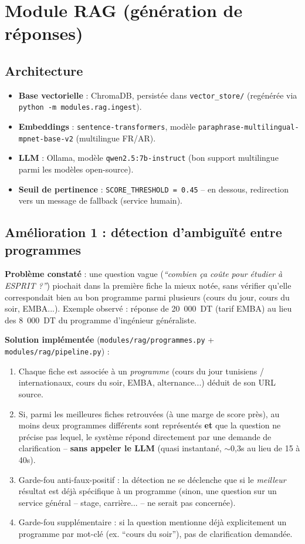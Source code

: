 \documentclass[11pt,a4paper]{report}
\begin{document}
\chapter{Module RAG (génération de réponses)}
\label{chap:rag}

\section{Architecture}
\begin{itemize}
    \item \textbf{Base vectorielle} : ChromaDB, persistée dans \texttt{vector\_store/}
    (regénérée via \texttt{python -m modules.rag.ingest}).
    \item \textbf{Embeddings} : \texttt{sentence-transformers}, modèle
    \texttt{paraphrase-multilingual-mpnet-base-v2} (multilingue FR/AR).
    \item \textbf{LLM} : Ollama, modèle \texttt{qwen2.5:7b-instruct} (bon support
    multilingue parmi les modèles open-source).
    \item \textbf{Seuil de pertinence} : \texttt{SCORE\_THRESHOLD = 0.45} -- en dessous,
    redirection vers un message de fallback (service humain).
\end{itemize}

\section{Amélioration 1 : détection d'ambiguïté entre programmes}
\textbf{Problème constaté} : une question vague (\emph{``combien ça coûte pour étudier à
ESPRIT ?''}) piochait dans la première fiche la mieux notée, sans vérifier qu'elle
correspondait bien au bon programme parmi plusieurs (cours du jour, cours du soir,
EMBA...). Exemple observé : réponse de 20~000~DT (tarif EMBA) au lieu des 8~000~DT du
programme d'ingénieur généraliste.

\textbf{Solution implémentée} (\texttt{modules/rag/programmes.py} +
\texttt{modules/rag/pipeline.py}) :
\begin{enumerate}
    \item Chaque fiche est associée à un \emph{programme} (cours du jour tunisiens /
    internationaux, cours du soir, EMBA, alternance...) déduit de son URL source.
    \item Si, parmi les meilleures fiches retrouvées (à une marge de score près), au
    moins deux programmes différents sont représentés \textbf{et} que la question ne
    précise pas lequel, le système répond directement par une demande de clarification
    -- \textbf{sans appeler le LLM} (quasi instantané, $\sim$0,3s au lieu de 15 à 40s).
    \item Garde-fou anti-faux-positif : la détection ne se déclenche que si le
    \emph{meilleur} résultat est déjà spécifique à un programme (sinon, une question sur
    un service général -- stage, carrière... -- ne serait pas concernée).
    \item Garde-fou supplémentaire : si la question mentionne déjà explicitement un
    programme par mot-clé (ex. ``cours du soir''), pas de clarification demandée.
\end{enumerate}
\end{document}
